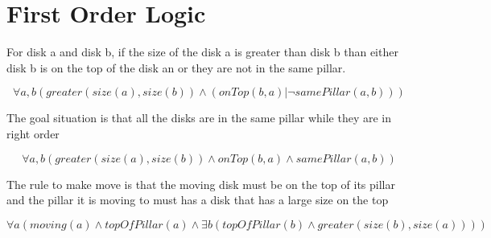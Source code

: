 \documentclass{article}
\begin{document}
\section{First Order Logic}
For disk a and disk b, if the size of the disk a is greater than disk b than either disk b is on the top of the disk an or they are not in the same pillar.

$$\forall a, b (greater(size(a), size(b)) \wedge  (onTop(b, a)  |  \neg samePillar(a, b)))$$

The goal situation is that all the disks are in the same pillar while they are in right order

$$\forall a, b (greater(size(a), size(b)) \wedge  onTop(b, a)  \wedge  samePillar(a, b))$$

The rule to make move is that the moving disk must be on the top of its pillar and the pillar it is moving to must has a disk that has a large size on the top

$$\forall a (moving(a) \wedge topOfPillar(a) \wedge \exists b (topOfPillar(b) \wedge greater(size(b), size(a))))$$
\end{document}
